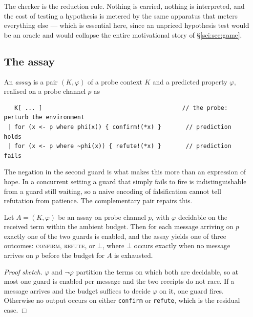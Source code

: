 The checker is the reduction rule. Nothing is carried, nothing is interpreted, and the cost of testing
a hypothesis is metered by the same apparatus that meters everything else --- which is essential here,
since an unpriced hypothesis test would be an oracle and would collapse the entire motivational story
of \S\ref{sci:sec:game}.

\subsection{The assay}\label{sci:S4.2}

\begin{definition}[Assay]
\label{sci:def:assay}
An \emph{assay} is a pair $(K, \varphi)$ of a probe context $K$ and a predicted property $\varphi$,
realised on a probe channel $p$ as
\begin{lstlisting}
   K[ ... ]                                        // the probe: perturb the environment
 | for (x <- p where phi(x)) { confirm!(*x) }       // prediction holds
 | for (x <- p where ~phi(x)) { refute!(*x) }       // prediction fails
\end{lstlisting}
\end{definition}

The negation in the second guard is what makes this more than an expression of hope. In a concurrent
setting a guard that simply fails to fire is indistinguishable from a guard still waiting, so a naive
encoding of falsification cannot tell refutation from patience. The complementary pair repairs this.

\begin{proposition}[Trichotomy]
\label{sci:prop:trichotomy}
Let $A = (K,\varphi)$ be an assay on probe channel $p$, with $\varphi$ decidable on the received term
within the ambient budget. Then for each message arriving on $p$ exactly one of the two guards is
enabled, and the assay yields one of three outcomes: \textsc{confirm}, \textsc{refute}, or $\bot$,
where $\bot$ occurs exactly when no message arrives on $p$ before the budget for $A$ is exhausted.
\end{proposition}

\begin{proof}[Proof sketch]
$\varphi$ and $\lnot\varphi$ partition the terms on which both are decidable, so at most one guard is
enabled per message and the two receipts do not race. If a message arrives and the budget suffices to
decide $\varphi$ on it, one guard fires. Otherwise no output occurs on either \texttt{confirm} or
\texttt{refute}, which is the residual case.
\end{proof}

